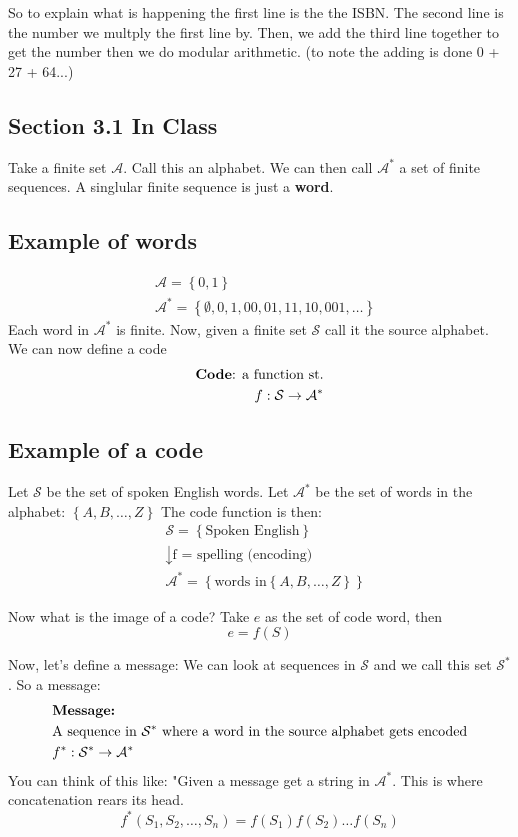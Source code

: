 \documentclass[12pt]{article}
\begin{document}
So to explain what is happening the first line is the the ISBN. The second line is the number we multply the first line by.
Then, we add the third line together to get the number then we do modular arithmetic. (to note the adding is done 0 + 27 + 64...)

\subsection*{Section 3.1 In Class}
Take a finite set $\mathcal{A}$. Call this an alphabet. We can then call $\mathcal{A}^*$ a set of finite sequences. A singlular finite sequence is just a \textbf{word}.

\subsection*{Example of words}
\begin{align*}
    &\mathcal{A} = \left\{0,1\right\}\\
    &\mathcal{A}^* = \left\{\emptyset, 0, 1, 00, 01, 11, 10, 001, \dots\right\} 
\end{align*}
Each word in $\mathcal{A}^*$ is finite.
\vspace{2mm}
Now, given a finite set $\mathcal{S}$ call it the source alphabet.
We can now define a code
\begin{align*}
    \text{\textbf{Code}: a function st.}\\
    f:\mathcal{S} \rightarrow \mathcal{A}^*
\end{align*}

\subsection*{Example of a code}
Let $\mathcal{S}$ be the set of spoken English words.
Let $\mathcal{A}^*$ be the set of words in the alphabet: $\left\{A,B,\dots,Z\right\}$
The code function is then:
\begin{align*}
    &\mathcal{S} = \left\{\text{Spoken English}\right\}\\
    &\downarrow \text{f = spelling (encoding)}\\
    &\mathcal{A}^* = \left\{\text{words in} \left\{A,B,\dots,Z\right\}\right\}
\end{align*}

Now what is the image of a code? Take $e$ as the set of code word, then
\[e = f(S)\]

Now, let's define a message:
We can look at sequences in $\mathcal{S}$ and we call this set $\mathcal{S}^*$. So a message:
\begin{align*}
    &\text{\textbf{Message:}}\\
    &\text{A sequence in } \mathcal{S}^* \text{ where a word in the source alphabet gets encoded}\\
    &f^*: \mathcal{S}^* \rightarrow \mathcal{A}^*
\end{align*}
You can think of this like: "Given a message get a string in $\mathcal{A}^*$. This is where concatenation rears its head.
\[f^*(S_1,S_2,\dots,S_n) = f(S_1)f(S_2) \dots f(S_n)\]
\end{document}
